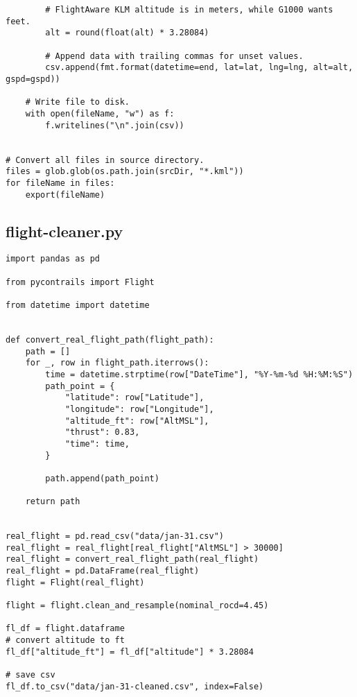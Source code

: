 \begin{verbatim}
        # FlightAware KLM altitude is in meters, while G1000 wants feet.
        alt = round(float(alt) * 3.28084)

        # Append data with trailing commas for unset values.
        csv.append(fmt.format(datetime=end, lat=lat, lng=lng, alt=alt, gspd=gspd))

    # Write file to disk.
    with open(fileName, "w") as f:
        f.writelines("\n".join(csv))


# Convert all files in source directory.
files = glob.glob(os.path.join(srcDir, "*.kml"))
for fileName in files:
    export(fileName)

\end{verbatim}
\subsection{flight-cleaner.py}
\begin{verbatim}
import pandas as pd

from pycontrails import Flight

from datetime import datetime


def convert_real_flight_path(flight_path):
    path = []
    for _, row in flight_path.iterrows():
        time = datetime.strptime(row["DateTime"], "%Y-%m-%d %H:%M:%S")
        path_point = {
            "latitude": row["Latitude"],
            "longitude": row["Longitude"],
            "altitude_ft": row["AltMSL"],
            "thrust": 0.83,
            "time": time,
        }

        path.append(path_point)

    return path


real_flight = pd.read_csv("data/jan-31.csv")
real_flight = real_flight[real_flight["AltMSL"] > 30000]
real_flight = convert_real_flight_path(real_flight)
real_flight = pd.DataFrame(real_flight)
flight = Flight(real_flight)

flight = flight.clean_and_resample(nominal_rocd=4.45)

fl_df = flight.dataframe
# convert altitude to ft
fl_df["altitude_ft"] = fl_df["altitude"] * 3.28084

# save csv
fl_df.to_csv("data/jan-31-cleaned.csv", index=False)

\end{verbatim}
